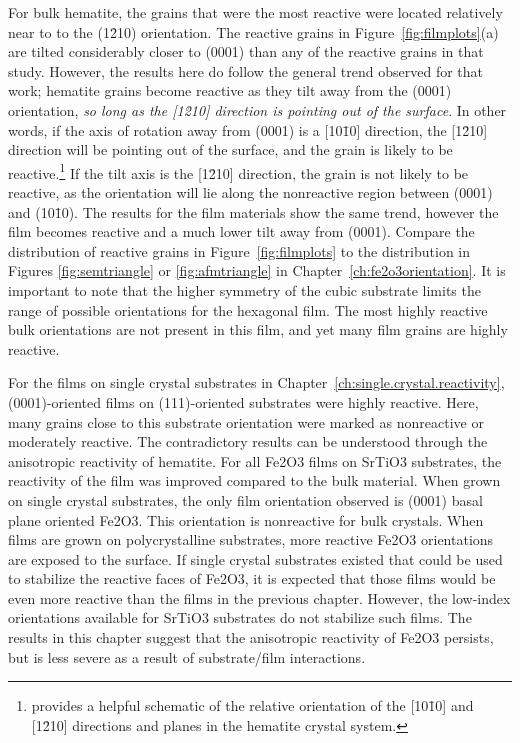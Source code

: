 \documentclass[12pt,%
              twoside,
               letterpaper]{uiothesis}
\begin{document}
For bulk hematite, the grains that were the most reactive were located relatively near to
to the (1\={2}10) orientation. The reactive grains in Figure~\ref{fig:filmplots}(a) are tilted
considerably closer to (0001) than any of the reactive grains in that study. However, the
results here do follow the general trend observed for that work; hematite grains become
reactive as they tilt away from the (0001) orientation, \emph{so long as the [1\={2}10]
direction is pointing out of the surface}. In other words, if the axis of rotation away
from (0001) is a [10\={1}0] direction, the [1\={2}10] direction will be pointing out of
the surface, and the grain is likely to be reactive.\footnote{
provides a helpful schematic of the relative orientation of the [10\={1}0] and [1\={2}10]
directions and planes in the hematite crystal system.} If the tilt axis is the [1\={2}10]
direction, the grain is not likely to be reactive, as the orientation will lie along the
nonreactive region between (0001) and (10\={1}0). The results for the film materials show
the same trend, however the film becomes reactive and a much lower tilt away from (0001).
Compare the distribution of reactive grains in Figure~\ref{fig:filmplots} to the distribution
in Figures \ref{fig:semtriangle} or \ref{fig:afmtriangle} in
Chapter~\ref{ch:fe2o3orientation}. It is important to note that the higher symmetry of the
cubic substrate limits the range of possible orientations for the hexagonal film.
The most highly reactive bulk orientations are not present in this film, and yet
many film grains are highly reactive.

For the films on single crystal substrates in Chapter~\ref{ch:single.crystal.reactivity},
(0001)-oriented films on (111)-oriented substrates were highly reactive. Here, many grains
close to this substrate orientation were marked as nonreactive or moderately reactive. The
contradictory results can be understood through the anisotropic reactivity of hematite.
For all Fe2O3 films on SrTiO3 substrates, the reactivity of the film was
improved compared to the bulk material. When grown on single crystal substrates, the only
film orientation observed is (0001)  basal plane oriented Fe2O3. This orientation is
nonreactive for bulk crystals. When films are grown on polycrystalline substrates, more
reactive Fe2O3 orientations are exposed to the surface. If single crystal substrates
existed that could be used to stabilize the reactive faces of Fe2O3, it is expected
that those films would be even more reactive than the films in the previous chapter.
However, the low-index orientations available for SrTiO3 substrates do not stabilize
such films. The results in this chapter suggest that the anisotropic reactivity of
Fe2O3 persists, but is less severe as a result of substrate/film interactions.
\end{document}
